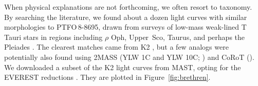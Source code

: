 \documentclass[12pt,twocolumn,tighten,trackchanges]{aastex62}
\newcommand{\ptfo}{PTFO$\,$8-8695}
\begin{document}
 When physical explanations are not
forthcoming, we often resort to taxonomy.  By searching the
literature, we found about a dozen light curves with similar
morphologies to \ptfo, drawn from surveys of low-mass weak-lined T
Tauri stars in regions including $\rho$ Oph, Upper~Sco, Taurus, and
perhaps the Pleiades
\citep{parks_periodic_2014,rebull_rotation_2016,david_transient_2017,stauffer_orbiting_2017,stauffer_rotevol_2018,rebull_usco_2018,rebull_rotation_2020}.
The clearest matches came from K2 \citep{howell_k2_2014}, but a few
analogs were potentially also found using 2MASS (YLW 1C and YLW 10C;
\citealt{parks_periodic_2014}) and CoRoT
(\citealt{stauffer_csi_2015}).  We downloaded a subset of the K2 light
curves from MAST, opting for the EVEREST reductions
\citep{luger_everest_2016,luger_update_2018}.  They are plotted in
Figure~\ref{fig:brethren}.
\end{document}
